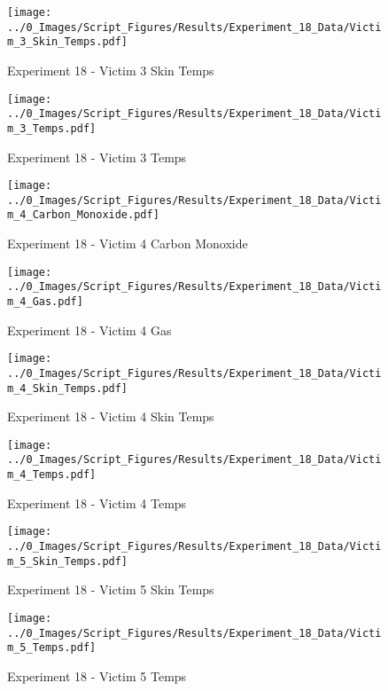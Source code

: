 	\begin{figure}[H]
		\centering
		\texttt{[image: ../0\_Images/Script\_Figures/Results/Experiment\_18\_Data/Victim\_3\_Skin\_Temps.pdf]}
		\caption[]{Experiment 18 - Victim 3 Skin Temps}
	\end{figure}
 
	\clearpage

	\begin{figure}[H]
		\centering
		\texttt{[image: ../0\_Images/Script\_Figures/Results/Experiment\_18\_Data/Victim\_3\_Temps.pdf]}
		\caption[]{Experiment 18 - Victim 3 Temps}
	\end{figure}
 

	\begin{figure}[H]
		\centering
		\texttt{[image: ../0\_Images/Script\_Figures/Results/Experiment\_18\_Data/Victim\_4\_Carbon\_Monoxide.pdf]}
		\caption[]{Experiment 18 - Victim 4 Carbon Monoxide}
	\end{figure}
 
	\clearpage

	\begin{figure}[H]
		\centering
		\texttt{[image: ../0\_Images/Script\_Figures/Results/Experiment\_18\_Data/Victim\_4\_Gas.pdf]}
		\caption[]{Experiment 18 - Victim 4 Gas}
	\end{figure}
 

	\begin{figure}[H]
		\centering
		\texttt{[image: ../0\_Images/Script\_Figures/Results/Experiment\_18\_Data/Victim\_4\_Skin\_Temps.pdf]}
		\caption[]{Experiment 18 - Victim 4 Skin Temps}
	\end{figure}
 
	\clearpage

	\begin{figure}[H]
		\centering
		\texttt{[image: ../0\_Images/Script\_Figures/Results/Experiment\_18\_Data/Victim\_4\_Temps.pdf]}
		\caption[]{Experiment 18 - Victim 4 Temps}
	\end{figure}
 

	\begin{figure}[H]
		\centering
		\texttt{[image: ../0\_Images/Script\_Figures/Results/Experiment\_18\_Data/Victim\_5\_Skin\_Temps.pdf]}
		\caption[]{Experiment 18 - Victim 5 Skin Temps}
	\end{figure}
 
	\clearpage

	\begin{figure}[H]
		\centering
		\texttt{[image: ../0\_Images/Script\_Figures/Results/Experiment\_18\_Data/Victim\_5\_Temps.pdf]}
		\caption[]{Experiment 18 - Victim 5 Temps}
	\end{figure}
 

